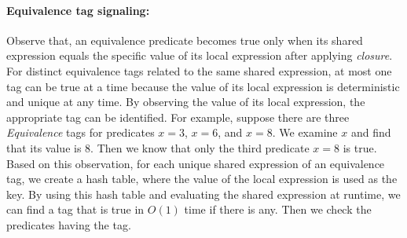\documentclass{sigplanconf}
\begin{document}
\paragraph{Equivalence tag signaling:}
Observe that, an equivalence predicate becomes true only when its shared 
expression equals the specific value of its local expression after applying
{\em closure}. For distinct equivalence tags related to the same shared 
expression, at most one tag can be true at a time because the value of its
local expression is deterministic and unique at any time. By 
observing the value of its local expression, the appropriate tag can be 
identified. For example, suppose there are three {\em Equivalence} tags for
predicates $x = 3$, $x = 6$, and $x = 8$. We examine $x$ and find that
its value is $8$. Then we know that only the third predicate $x = 8$ is true. Based on this 
observation, for each unique shared expression of an equivalence tag, we 
create a hash table, where the value of the local expression is used as the 
key. By using this 
hash table and evaluating the shared expression at runtime, we can find a
tag that is true in $O(1)$ time if there is any. Then we check the predicates 
having the tag. 

\end{document}
